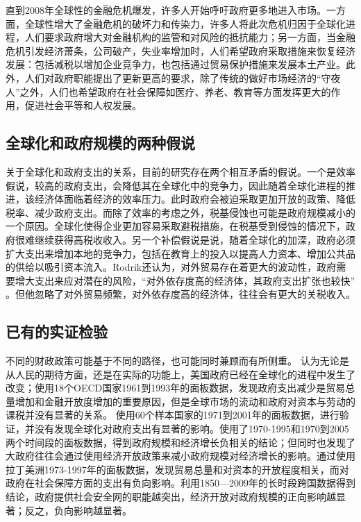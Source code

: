 \documentclass[10pt]{article}
\begin{document}
直到2008年全球性的金融危机爆发，许多人开始呼吁政府更多地进入市场。一方面，全球性增大了金融危机的破坏力和传染力，许多人将此次危机归因于全球化进程，人们要求政府增大对金融机构的监管和对风险的抵抗能力；另一方面，当金融危机引发经济萧条，公司破产，失业率增加时，人们希望政府采取措施来恢复经济发展：包括减税以增加企业竞争力，也包括通过贸易保护措施来发展本土产业。此外，人们对政府职能提出了更新更高的要求，除了传统的做好市场经济的“守夜人”之外，人们也希望政府在社会保障如医疗、养老、教育等方面发挥更大的作用，促进社会平等和人权发展。
\subsection{全球化和政府规模的两种假说}
关于全球化和政府支出的关系，目前的研究存在两个相互矛盾的假说\cite{garrett2001globalization}。一个是效率假说，较高的政府支出，会降低其在全球化中的竞争力，因此随着全球化进程的推进，该经济体面临着经济的效率压力。此时政府会被迫采取更加开放的政策、降低税率、减少政府支出\cite{wangyu2014}。而除了效率的考虑之外，税基侵蚀也可能是政府规模减小的一个原因。全球化使得企业更加容易采取避税措施，在税基受到侵蚀的情况下，政府很难继续获得高税收收入\cite{tanzi2000globalization}。另一个补偿假说是说，随着全球化的加深，政府必须扩大支出来增加本地的竞争力，包括在教育上的投入以提高人力资本、增加公共品的供给以吸引资本流入\cite{rodrik1998more}。Rodrik还认为，对外贸易存在着更大的波动性，政府需要增大支出来应对潜在的风险，“对外依存度高的经济体，其政府支出扩张也较快” \cite{rodrik1998more}。但他忽略了对外贸易频繁，对外依存度高的经济体，往往会有更大的关税收入\cite{tanzi1973theory}。
\subsection{已有的实证检验}
不同的财政政策可能基于不同的路径，也可能同时兼顾而有所侧重。\cite{kettl2000transformation} 认为无论是从人民的期待方面，还是在实际的功能上，美国政府已经在全球化的进程中发生了改变；\cite{garrett2001globalization}使用18个OECD国家1961到1993年的面板数据，发现政府支出减少是贸易总量增加和金融开放度增加的重要原因，但是全球市场的流动和政府对资本与劳动的课税并没有显著的关系。\cite{dreher2008impact} 使用60个样本国家的1971到2001年的面板数据，进行验证，并没有发现全球化对政府支出有显著的影响。\cite{bergh2010government}使用了1970-1995和1970到2005两个时间段的面板数据，得到政府规模和经济增长负相关的结论；但同时也发现了大政府往往会通过使用经济开放政策来减小政府规模对经济增长的影响。\cite{kaufman2001globalization}通过使用拉丁美洲1973-1997年的面板数据，发现贸易总量和对资本的开放程度相关，而对政府在社会保障方面的支出有负向影响。\cite{maojie2015}利用1850—2009年的长时段跨国数据得到结论，政府提供社会安全网的职能越突出，经济开放对政府规模的正向影响越显著；反之，负向影响越显著。
\end{document}
